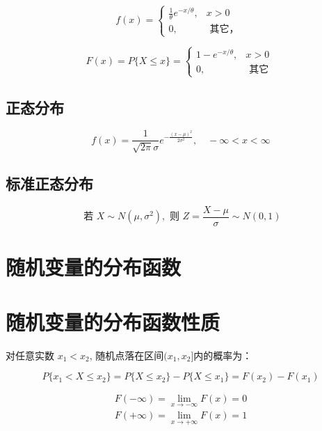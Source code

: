 \begin{equation}
f(x)=\left\{\begin{array}{ll}
\frac{1}{\theta} e^{-x / \theta}, & x>0 \\
0, & \text { 其它， }
\end{array}\right.
\end{equation}

\begin{equation}
F(x)=P\{X \leq x\}=\left\{\begin{array}{ll}
1-e^{-x / \theta}, & x>0 \\
0, & \text { 其它 }
\end{array}\right.
\end{equation}

\subsection{正态分布}

\begin{equation}
f(x)=\frac{1}{\sqrt{2 \pi} \sigma} e^{-\frac{(x-\mu)^{2}}{2 \sigma^{2}}}, \quad-\infty<x<\infty
\end{equation}

\subsection{标准正态分布}

\begin{equation}
\text { 若 } X \sim N\left(\mu, \sigma^{2}\right), \text { 则 } Z=\frac{X-\mu}{\sigma} \sim N({0}, 1)
\end{equation}

\section{随机变量的分布函数}

\section{随机变量的分布函数性质}

对任意实数 $x_1<x_2$, 随机点落在区间$( x_1 ,  x_2 ]$内的概率为：

\begin{equation}
P\{ x_1<X  \le  x_2\} =P\{ X  \le   x_2 \} - P\{ X  \le   x_1 \}= F(x_2)-F(x_1)
\end{equation}

\begin{equation}
\begin{array}{l}
F(-\infty)=\lim_{x \rightarrow-\infty} F(x)=0 \\
F(+\infty)=\lim_{x \rightarrow+\infty} F(x)=1
\end{array}
\end{equation}

